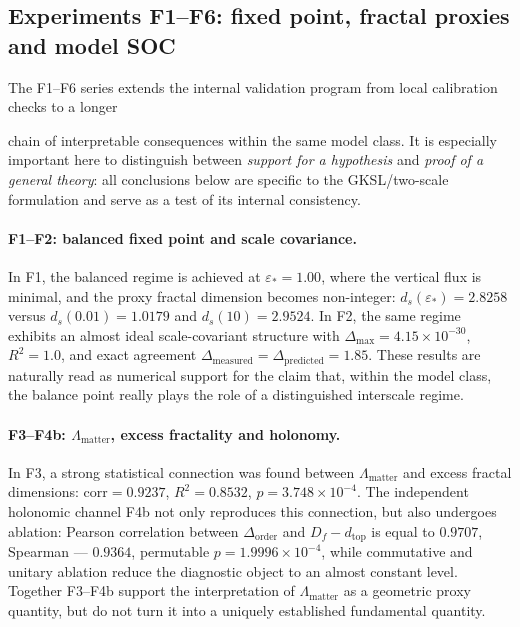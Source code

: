 \documentclass[11pt,a4paper]{article}
\theoremstyle{definition}
\theoremstyle{plain}
\theoremstyle{remark}
\begin{document}
\subsection{Experiments F1--F6: fixed point, fractal proxies and model SOC}

The F1--F6 series extends the internal validation program from local calibration checks to a longer
\label{sec:numerics:Fseries}

chain of interpretable consequences within the same model class.
It is especially important here to distinguish between \emph{support for a hypothesis} and \emph{proof of a general theory}:
all conclusions below are specific to the GKSL/two-scale formulation and serve as a test of its internal consistency.
\paragraph{F1--F2: balanced fixed point and scale covariance.}

In F1, the balanced regime is achieved at $\varepsilon_\ast=1.00$, where the vertical flux is minimal,
and the proxy fractal dimension becomes non-integer: $d_s(\varepsilon_\ast)=2.8258$ versus
$d_s(0.01)=1.0179$ and $d_s(10)=2.9524$.
In F2, the same regime exhibits an almost ideal scale-covariant structure with
$\Delta_{\max}=4.15\times10^{-30}$, $R^2=1.0$, and exact agreement
$\Delta_{\mathrm{measured}}=\Delta_{\mathrm{predicted}}=1.85$.
These results are naturally read as numerical support for the claim that, within the model class,
the balance point really plays the role of a distinguished interscale regime.

\paragraph{F3--F4b: $\Lambda_{\mathrm{matter}}$, excess fractality and holonomy.}
In F3, a strong statistical connection was found between $\Lambda_{\mathrm{matter}}$ and excess fractal dimensions:
$\mathrm{corr}=0.9237$, $R^2=0.8532$, $p=3.748\times10^{-4}$.
The independent holonomic channel F4b not only reproduces this connection, but also undergoes ablation:
Pearson correlation between $\Delta_{\mathrm{order}}$ and $D_f-d_{\mathrm{top}}$ is equal to $0.9707$,
Spearman --- $0.9364$, permutable $p=1.9996\times10^{-4}$, while commutative and unitary ablation
reduce the diagnostic object to an almost constant level.
Together F3--F4b support the interpretation of $\Lambda_{\mathrm{matter}}$ as a geometric proxy quantity,
but do not turn it into a uniquely established fundamental quantity.
\end{document}
